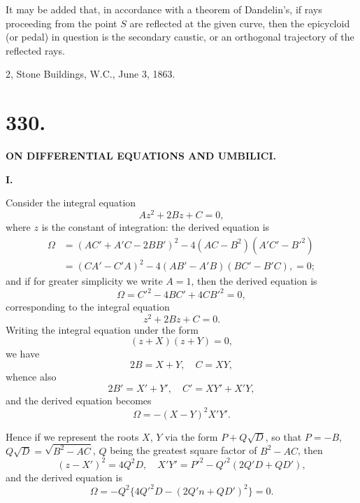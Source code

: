 \documentclass[11pt,a4paper]{article}
\begin{document}
It may be added that, in accordance with a theorem of Dandelin's, if rays proceeding from the point $S$ are reflected at the given curve, then the epicycloid (or pedal) in question is the secondary caustic, or an orthogonal trajectory of the reflected rays.

\begin{flushright}
2, Stone Buildings, W.C., June 3, 1863.
\end{flushright}

\newpage
\section*{330.}

\begin{center}
\textbf{ON DIFFERENTIAL EQUATIONS AND UMBILICI.}
\end{center}


\bigskip

\noindent \textbf{I.}

\medskip

\noindent Consider the integral equation
\[
Az^2 + 2Bz + C = 0,
\]
where $z$ is the constant of integration: the derived equation is
\begin{align*}
\Omega &= (AC' + A'C - 2BB')^2 - 4(AC-B^2)(A'C'-B'^2) \\
&= (CA' - C'A)^2 - 4(AB' - A'B)(BC' - B'C), = 0;
\end{align*}
and if for greater simplicity we write $A=1$, then the derived equation is
\[
\Omega = C'^2 - 4BC' + 4CB'^2 = 0,
\]
corresponding to the integral equation
\[
z^2 + 2Bz + C = 0.
\]
Writing the integral equation under the form
\[
(z+X)(z+Y) = 0,
\]
we have
\[
2B = X+Y, \quad C = XY,
\]
whence also
\[
2B' = X'+Y', \quad C' = XY' + X'Y,
\]
and the derived equation becomes
\[
\Omega = -(X-Y)^2 X'Y'.
\]

Hence if we represent the roots $X$, $Y$ via the form $P + Q\sqrt{D}$, so that $P=-B$, $Q\sqrt{D} = \sqrt{B^2 - AC}$, $Q$ being the greatest square factor of $B^2 - AC$, then
\[
(z-X')^2 = 4Q^2 D, \quad X'Y' = P'^2 - Q'^2(2Q'D + QD'),
\]
and the derived equation is
\[
\Omega = -Q^2\{4Q'^2 D - (2Q'n + QD')^2\} = 0.
\]
\end{document}
